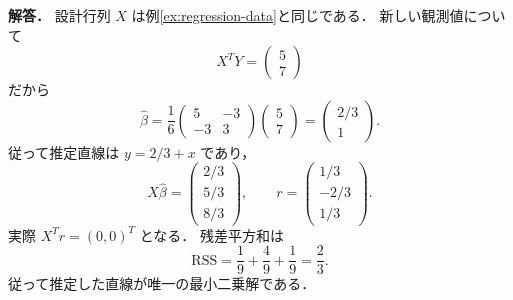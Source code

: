 \documentclass[a5paper,10pt,onecolumn]{jsarticle}
\theoremstyle{mathnotetheorem}
\begin{document}
\medskip\noindent\textbf{解答．}
設計行列 $X$ は例\ref{ex:regression-data}と同じである．
新しい観測値について
\[
 X^TY=\begin{pmatrix}5\\7\end{pmatrix}
\]
だから
\[
 \widehat\beta=
 \frac16\begin{pmatrix}5&-3\\-3&3\end{pmatrix}
       \begin{pmatrix}5\\7\end{pmatrix}
 =\begin{pmatrix}2/3\\1\end{pmatrix}.
\]
従って推定直線は $y=2/3+x$ であり，
\[
 X\widehat\beta=
 \begin{pmatrix}2/3\\5/3\\8/3\end{pmatrix},
 \qquad
 r=\begin{pmatrix}1/3\\-2/3\\1/3\end{pmatrix}.
\]
実際 $X^Tr=(0,0)^T$ となる．
残差平方和は
\[
 \mathrm{RSS}
 =\frac19+\frac49+\frac19=\frac23.
\]
従って推定した直線が唯一の最小二乗解である．
\end{document}
